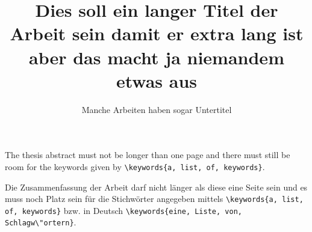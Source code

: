 \documentclass[online,a4paper,description-bsc]{isw}
\begin{document}
    \frontmatter
    
    \maketitle
    
    \begin{otherlanguage}{ngerman}
        \title{Dies soll ein langer Titel der Arbeit sein damit er extra lang ist aber das macht ja niemandem etwas aus}
        \subtitle{Manche Arbeiten haben sogar Untertitel}
        
        \maketitle
    \end{otherlanguage}
    
    
    
    \begin{thesisabstract}
        The thesis abstract must not be longer than one page and there must still be room for the keywords given by \lstinline!\keywords{a, list, of, keywords}!.
        
        \lipsum[1-3]
    \end{thesisabstract}
    
    \begin{otherlanguage}{ngerman}
        \begin{thesisabstract}
            Die Zusammenfassung der Arbeit darf nicht l\"anger als diese eine Seite sein und es muss noch Platz sein f\"ur die Stichw\"orter angegeben mittels \lstinline!\keywords{a, list, of, keywords}! bzw. in Deutsch \lstinline!\keywords{eine, Liste, von, Schlagw\"ortern}!.
            
            \lipsum[4-6]
        \end{thesisabstract}
    \end{otherlanguage}
    
\end{document}
